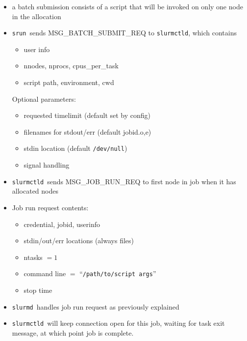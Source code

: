 \documentclass[article,letter,landscape]{seminar}
\newcommand{\slurmd}{{\tt slurmd}}
\newcommand{\slurmctld}{{\tt slurmctld}}
\newcommand{\srun}{{\tt srun}}
\begin{document}
\begin{slide}
  \begin{center}
  \begin{itemize}
    \item a batch submission consists of a script that will be invoked
          on only one node in the allocation
    \item \srun\ sends MSG\_BATCH\_SUBMIT\_REQ to \slurmctld , which contains
    \begin{itemize}
      \item user info
      \item nnodes, nprocs, cpus\_per\_task
      \item script path, environment, cwd
    \end{itemize}
    Optional parameters:
    \begin{itemize}
      \item requested timelimit (default set by config)
      \item filenames for stdout/err (default jobid.o,e)
      \item stdin location (default {\tt /dev/null})
      \item signal handling
    \end{itemize}
  \end{itemize}
  \end{center}
\end{slide}

\begin{slide}
  \begin{center}
  \begin{itemize}
    \item \slurmctld\ sends MSG\_JOB\_RUN\_REQ to first node in job
          when it has allocated nodes
    \item Job run request contents:
    \begin{itemize}
      \item credential, jobid, userinfo
      \item stdin/out/err locations (always files)
      \item ntasks $=1$
      \item command line $=$ ``{\tt /path/to/script args}''
      \item stop time
    \end{itemize}
  \item \slurmd\ handles job run request as previously explained
  \item \slurmctld\ will keep connection open for this job, waiting
        for task exit message, at which point job is complete.
  \end{itemize}
  \end{center}
\end{slide}
\end{document}
